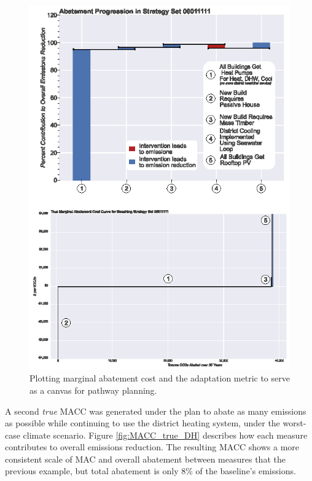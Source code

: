 \documentclass[twocolumn, a4paper,10pt]{article}
\begin{document}
\begin{figure}[t]
    \centering
    \includegraphics[scale=0.8]{figures/true_macc_noDH_waterfall_comb.eps}
    \caption{Plotting marginal abatement cost and the adaptation metric to serve as a canvas for pathway planning.}
    \label{fig:MACC_true_noDH}
\end{figure}

A second \textit{true} MACC was generated under the plan to abate as many emissions as possible while continuing to use the district heating system, under the worst-case climate scenario. Figure \ref{fig:MACC_true_DH} describes how each measure contributes to overall emissions reduction. The resulting MACC shows a more consistent scale of MAC and overall abatement between measures that the previous example, but total abatement is only 8\% of the baseline's emissions.

\end{document}
